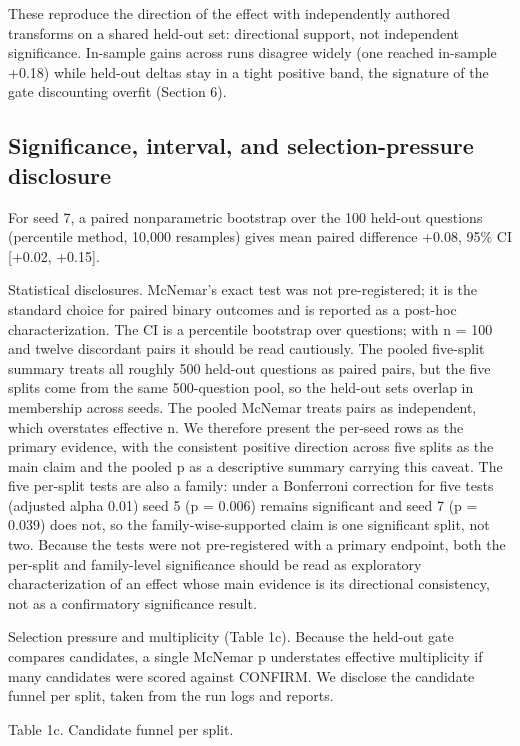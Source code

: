 These reproduce the direction of the effect with independently authored transforms on a shared held-out set: directional support, not independent significance. In-sample gains across runs disagree widely (one reached in-sample +0.18) while held-out deltas stay in a tight positive band, the signature of the gate discounting overfit (Section 6).

\subsection{Significance, interval, and selection-pressure disclosure}

For seed 7, a paired nonparametric bootstrap over the 100 held-out questions (percentile method, 10,000 resamples) gives mean paired difference +0.08, 95\% CI [+0.02, +0.15].

Statistical disclosures. McNemar's exact test was not pre-registered; it is the standard choice for paired binary outcomes and is reported as a post-hoc characterization. The CI is a percentile bootstrap over questions; with n = 100 and twelve discordant pairs it should be read cautiously. The pooled five-split summary treats all roughly 500 held-out questions as paired pairs, but the five splits come from the same 500-question pool, so the held-out sets overlap in membership across seeds. The pooled McNemar treats pairs as independent, which overstates effective n. We therefore present the per-seed rows as the primary evidence, with the consistent positive direction across five splits as the main claim and the pooled p as a descriptive summary carrying this caveat. The five per-split tests are also a family: under a Bonferroni correction for five tests (adjusted alpha 0.01) seed 5 (p = 0.006) remains significant and seed 7 (p = 0.039) does not, so the family-wise-supported claim is one significant split, not two. Because the tests were not pre-registered with a primary endpoint, both the per-split and family-level significance should be read as exploratory characterization of an effect whose main evidence is its directional consistency, not as a confirmatory significance result.

Selection pressure and multiplicity (Table 1c). Because the held-out gate compares candidates, a single McNemar p understates effective multiplicity if many candidates were scored against CONFIRM. We disclose the candidate funnel per split, taken from the run logs and reports.

Table 1c. Candidate funnel per split.

